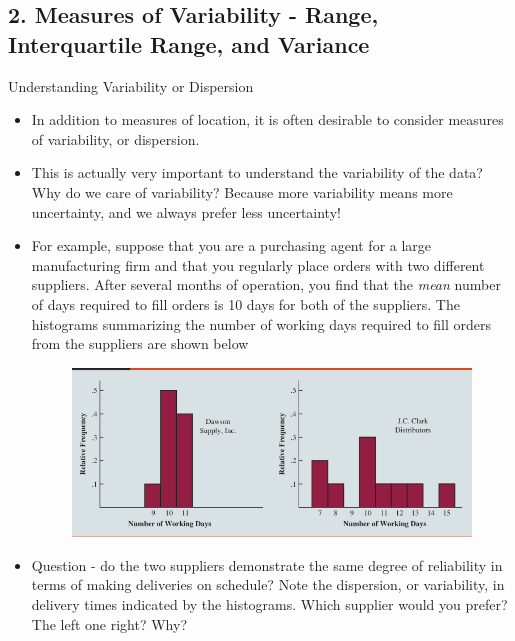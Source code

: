 \documentclass[8pt, usepdftitle=false]{beamer}
\begin{document}
\subsection{2. Measures of Variability - Range, Interquartile Range, and Variance}
\frame{\subsectionpage}


\begin{frame}[allowframebreaks]{Understanding Variability or Dispersion}

\begin{itemize}
   
   \item In addition to measures of location, it is often desirable to consider measures of variability, or dispersion. 

   \item This is actually very important to understand the variability of the data? Why do we care of variability? Because more variability means more uncertainty, and we always prefer less uncertainty!

   \item For example, suppose that you are a purchasing agent for a large manufacturing firm and that you regularly place orders with two different suppliers. After several months of operation, you find that the \emph{mean} number of days required to fill orders is 10 days for both of the suppliers. The histograms summarizing the number of working days required to fill orders from the suppliers are shown below

   \begin{figure}[H]
   \includegraphics[scale = .4]{Images/variability.png}
     
   \end{figure}

   \item Question - do the two suppliers demonstrate the same degree of reliability in terms of making deliveries on schedule? Note the dispersion, or variability, in delivery times indicated by the histograms. Which supplier would you prefer? The left one right? Why?

\end{itemize}


\end{frame}
\end{document}
